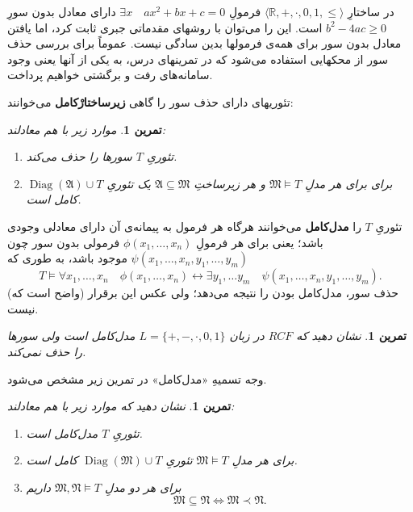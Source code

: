 \documentclass[12pt,a4paper]{report}
\theoremstyle{colorhead}
\newtheorem{tam}[thm]{تمرین}
\DeclareMathOperator{\diag}{Diag}
\begin{document}
در ساختارِ
$\langle \mathbb{R},+,\cdot,0,1,\leq\rangle$
 فرمولِ
 $\exists x\quad ax^2+bx+c=0$
 دارای معادل بدون سورِ
 $b^2-4ac\geq 0$
 است. این را می‌توان با روشهای مقدماتی جبری ثابت کرد، اما یافتن معادل بدون سور برای همه‌ی فرمولها بدین سادگی نیست. عموماً برای بررسی حذف سور از محکهایی استفاده می‌شود که در تمرینهای درس، به یکی از آنها یعنی وجود سامانه‌های رفت و برگشتی خواهیم پرداخت. 
 \par 
 تئوریهای دارای حذف سور را گاهی 
\textbf{زیرساختارْکامل}
 می‌خوانند:
 \begin{tam}
موارد زیر با هم معادلند:
 \begin{enumerate}
 \item 
  تئوریِ
  $T$
  سورها را حذف می‌کند.
 \item 
 $\diag(\mathfrak{A})\cup T$
 برای 
 برای هر مدلِ
 $\mathfrak{M}\models T$
 و هر زیرساختِ
  $\mathfrak{A}\subseteq \mathfrak{M}$
  یک تئوریِ
  کامل است. 	
 \end{enumerate}
 \end{tam}
تئوریِ
$T$
را 
\textbf{مدل‌کامل}
 می‌خوانند هرگاه هر فرمول به پیمانه‌ی آن دارای معادلی وجودی باشد؛ یعنی برای هر فرمولِ
$\phi(x_1,\ldots,x_n)$
فرمولی 
بدون سور چون
$\psi(x_1,\ldots,x_n,y_1,\ldots,y_m)$
موجود 
باشد، به طوری که
\[
T\models \forall x_1,\ldots,x_n \quad \phi(x_1,\ldots,x_n)\leftrightarrow \exists y_1,\ldots y_m \quad \psi(x_1,\ldots,x_n,y_1,\ldots,y_m).
\]
(واضح است که)
   حذف
   سور، مدل‌کامل بودن را نتیجه می‌دهد؛ ولی عکس این برقرار نیست.
   \begin{tam}
   نشان دهید که 
   $RCF$
   در زبان
   $L=\{+,-,\cdot,0,1\}$
    مدل‌کامل است ولی سورها را حذف نمی‌کند.
   \end{tam}
وجه تسمیهِ «مدل‌کامل» در تمرین زیر مشخص می‌شود.
  \begin{tam}
  نشان دهید که موارد زیر با هم معادلند:
  \begin{enumerate}
  \item 
  تئوریِ
  $T$
  مدل‌کامل
  است.
  \item 
  برای هر مدلِ
  $\mathfrak{M}\models T$
       تئوریِ
       $\diag(\mathfrak{M})\cup T$
        کامل 
        است.
  \item 
  برای هر دو مدلِ
  $\mathfrak{M},\mathfrak{N}\models T$
  داریم
  \[
  \mathfrak{M}\subseteq \mathfrak{N}\Leftrightarrow \mathfrak{M}\prec \mathfrak{N}.
  \]
  \end{enumerate}
  \end{tam}
\pagebreak
\end{document}
